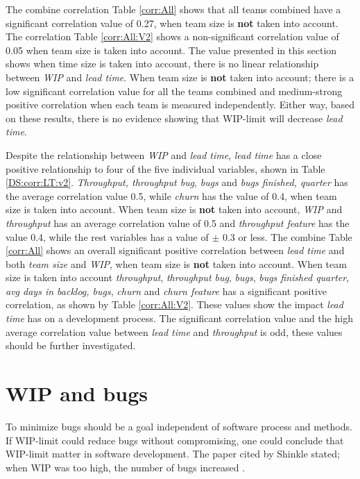 \documentclass[UKenglish]{ifimaster}  %
\begin{document}
The combine correlation Table \ref{corr:All} shows that all teams combined have a significant correlation value of 0.27, when team size is \textbf{not} taken into account.  The correlation Table \ref{corr:All:V2} shows a non-significant correlation value of 0.05 when team size is taken into account. The value presented in this section shows when time size is taken into account, there is no linear relationship between \textit{WIP} and \textit{lead time}. When team size is \textbf{not} taken into account; there is a low significant correlation value for all the teams combined and medium-strong positive correlation when each team is measured independently. Either way, based on these results, there is no evidence showing that WIP-limit will decrease \textit{lead time}.


Despite the relationship between \textit{WIP} and \textit{lead time},  \textit{lead time} has a close positive relationship to four of the five individual variables, shown in Table \ref{DS:corr:LT:v2}. \textit{Throughput, throughput bug}, \textit{bugs} and  \textit{bugs finished, quarter}  has the average correlation value 0.5, while \textit{churn} has the value of 0.4, when team size is taken into account. When team size is \textbf{not} taken into account, \textit{WIP} and \textit{throughput} has an average correlation value of 0.5 and \textit{throughput feature} has the value 0.4, while the rest variables has a value of $\pm$ 0.3 or less. The combine Table \ref{corr:All} shows an overall significant positive correlation between \textit{lead time} and both \textit{team size} and \textit{WIP}, when team size is \textbf{not} taken into account. When team size is taken into account \textit{throughput}, \textit{throughput bug}, \textit{bugs}, \textit{bugs finished quarter}, \textit{avg days in backlog, bugs}, \textit{churn} and \textit{churn feature} has a significant positive correlation, as shown by Table \ref{corr:All:V2}. These values show the impact \textit{lead time} has on a development process.  The significant correlation value and the high average correlation value between \textit{lead time} and \textit{throughput} is odd, these values should be further investigated. 

\section{WIP and bugs}
To minimize bugs should be a goal independent of software process and methods. If WIP-limit could reduce bugs without compromising, one could conclude that WIP-limit matter in software development. The paper cited by Shinkle stated; when WIP was too high, the number of bugs increased  \parencite{Shinkle}.
\end{document}
